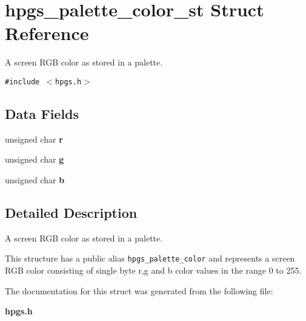 \section{hpgs\_\-palette\_\-color\_\-st Struct Reference}
\label{structhpgs__palette__color__st}
A screen RGB color as stored in a palette.  


{\tt \#include $<$hpgs.h$>$}

\subsection*{Data Fields}
\begin{CompactItemize}
\item 
unsigned char \textbf{r}\label{structhpgs__palette__color__st_4c1c1cc206462ddf3859578221011dbb}

\item 
unsigned char \textbf{g}\label{structhpgs__palette__color__st_7c7f8e4b90a61257de498677d0441f60}

\item 
unsigned char \textbf{b}\label{structhpgs__palette__color__st_05b25a11373ddb61f6102fdb8ba4ba37}

\end{CompactItemize}


\subsection{Detailed Description}
A screen RGB color as stored in a palette. 

This structure has a public alias {\tt hpgs\_\-palette\_\-color} and represents a screen RGB color consisting of single byte r,g and b color values in the range 0 to 255. 

The documentation for this struct was generated from the following file:\begin{CompactItemize}
\item 
{\bf hpgs.h}\end{CompactItemize}
